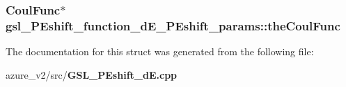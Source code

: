 \subsubsection{\setlength{\rightskip}{0pt plus 5cm}\bf{Coul\-Func}$\ast$ \bf{gsl\_\-PEshift\_\-function\_\-d\-E\_\-PEshift\_\-params::the\-Coul\-Func}}\label{structgsl__PEshift__function__dE__PEshift__params_98a72c99518b3f3caa9bbadf21a9c36d}




The documentation for this struct was generated from the following file:\begin{CompactItemize}
\item 
azure\_\-v2/src/\bf{GSL\_\-PEshift\_\-d\-E.cpp}\end{CompactItemize}
